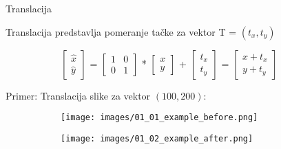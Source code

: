 \documentclass[bookmarks=true,bookmarksopen=true,pdfborder={0 0 0},pdfhighlight={/N},linkbordercolor={.5 .5 .5},implicit=false,unicode,xcolor={table}]{beamer}
\begin{document}
\begin{frame}{Translacija}

  Translacija predstavlja pomeranje tačke za vektor T = $(t_{x}, t_{y})$
  \begin{figure}
    \begin{subfigure}{8cm}
      $\begin{bmatrix}
        \hat{x}\\
        \hat{y}
        \end{bmatrix}$
      =
      $\begin{bmatrix}
        1 & 0\\
        0 & 1
        \end{bmatrix}$
      *
      $\begin{bmatrix}
        x\\
        y
        \end{bmatrix}$
      + 
      $\begin{bmatrix}
        t_{x}\\
        t_{y}
        \end{bmatrix}$
      =
      $\begin{bmatrix}
        x + t_{x}\\
        y + t_{y}
        \end{bmatrix}$
    \end{subfigure}
  \end{figure}

  Primer: Translacija slike za vektor $(100, 200)$:
  \begin{figure}
    \begin{subfigure}{5cm}
      \texttt{[image: images/01\_01\_example\_before.png]}
    \end{subfigure}
    \begin{subfigure}{5cm}
      \texttt{[image: images/01\_02\_example\_after.png]}
    \end{subfigure}
  \end{figure}

\end{frame}
\end{document}
